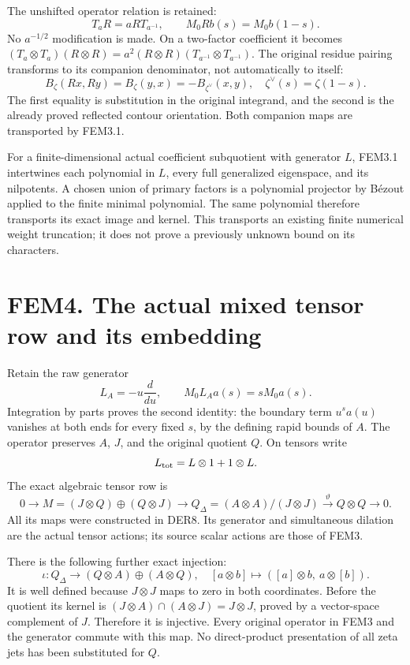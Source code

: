 The unshifted operator relation is retained: \[
T_aR=aRT_{a^{-1}},\qquad M_0Rb(s)=M_0b(1-s).
\tag{FEM3.3}
\] No \(a^{-1/2}\) modification is made. On a two-factor coefficient it
becomes \((T_a\otimes T_a)(R\otimes R)
=a^2(R\otimes R)(T_{a^{-1}}\otimes T_{a^{-1}})\). The original residue
pairing transforms to its companion denominator, not automatically to
itself: \[
B_\zeta(Rx,Ry)=B_\zeta(y,x)=-B_{\zeta^\vee}(x,y),
\quad \zeta^\vee(s)=\zeta(1-s).
\tag{FEM3.4}
\] The first equality is substitution in the original integrand, and the
second is the already proved reflected contour orientation. Both
companion maps are transported by FEM3.1.

For a finite-dimensional actual coefficient subquotient with generator
\(L\), FEM3.1 intertwines each polynomial in \(L\), every full
generalized eigenspace, and its nilpotents. A chosen union of primary
factors is a polynomial projector by Bézout applied to the finite
minimal polynomial. The same polynomial therefore transports its exact
image and kernel. This transports an existing finite numerical weight
truncation; it does not prove a previously unknown bound on its
characters.

\section{FEM4. The actual mixed tensor row and its
embedding}\label{fem4.-the-actual-mixed-tensor-row-and-its-embedding}

Retain the raw generator \[
L_A=-u\frac{d}{du},\qquad M_0L_Aa(s)=sM_0a(s).
\tag{FEM4.1}
\] Integration by parts proves the second identity: the boundary term
\(u^sa(u)\) vanishes at both ends for every fixed \(s\), by the defining
rapid bounds of \(A\). The operator preserves \(A\), \(J\), and the
original quotient \(Q\). On tensors write \[
L_{\rm tot}=L\otimes1+1\otimes L.
\] The exact algebraic tensor row is \[
0\to M=(J\otimes Q)\oplus(Q\otimes J)
\longrightarrow Q_\Delta=(A\otimes A)/(J\otimes J)
\xrightarrow{\vartheta}Q\otimes Q\to0.
\tag{FEM4.2}
\] All its maps were constructed in DER8. Its generator and simultaneous
dilation are the actual tensor actions; its source scalar actions are
those of FEM3.

There is the following further exact injection: \[
\iota:Q_\Delta\longrightarrow(Q\otimes A)\oplus(A\otimes Q),
\quad
[a\otimes b]\longmapsto([a]\otimes b,\ a\otimes[b]).
\tag{FEM4.3}
\] It is well defined because \(J\otimes J\) maps to zero in both
coordinates. Before the quotient its kernel is
\((J\otimes A)\cap(A\otimes J)=J\otimes J\), proved by a vector-space
complement of \(J\). Therefore it is injective. Every original operator
in FEM3 and the generator commute with this map. No direct-product
presentation of all zeta jets has been substituted for \(Q\).

